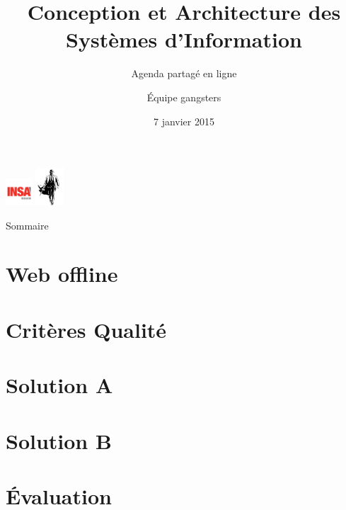 \documentclass[9pt,table]{beamer}
\title{Conception et Architecture des Systèmes d'Information}
\subtitle{Agenda partagé en ligne}
\author{Équipe gangsters}
\date{7 janvier 2015}
\begin{document}
\begin{frame}[plain]
	\titlepage
	\begin{center}
		\includegraphics[height=10mm]{images/logoInsa} \hspace{0.5cm}
		\includegraphics[height=14mm]{images/logoGangsters} \hspace{0.5cm}
	\end{center}
\end{frame}

\begin{frame}{Sommaire}
	 \vspace{1cm}
	 \tableofcontents
\end{frame}
\section{Web offline}


\section{Critères Qualité}


\section{Solution A}


\section{Solution B}


\section{\'Evaluation}

\end{document}
